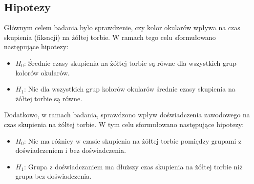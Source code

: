     \subsection{Hipotezy}
    Głównym celem badania było sprawdzenie, czy kolor okularów wpływa na czas skupienia (fiksacji) na żółtej torbie.
    W ramach tego celu sformułowano następujące hipotezy:
    \begin{itemize}
        \item $H_0$: Średnie czasy skupienia na żółtej torbie są równe dla wszystkich grup kolorów okularów.
        \item $H_1$: Nie dla wszystkich grup kolorów okularów średnie czasy skupienia na żółtej torbie są równe.
    \end{itemize}
    
    Dodatkowo, w ramach badania, sprawdzono wpływ doświadczenia zawodowego na czas skupienia na żółtej torbie.
    W tym celu sformułowano następujące hipotezy:
    \begin{itemize}
        \item $H_0$: Nie ma różnicy w czasie skupienia na żółtej torbie pomiędzy grupami z doświadczeniem i bez doświadczenia.
        \item $H_1$: Grupa z doświadczaniem ma dłuższy czas skupienia na żółtej torbie niż grupa bez doświadczenia.
    \end{itemize}
    
